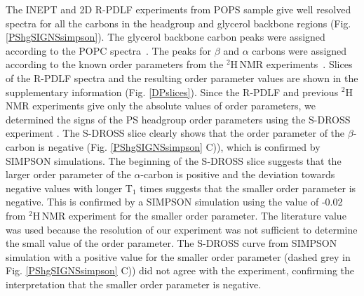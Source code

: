 \documentclass[aps,prl,superscriptaddress,twocolumn]{revtex4}
\begin{document}
The INEPT and 2D R-PDLF experiments from POPS sample give well resolved spectra for all the
carbons in the headgroup and glycerol backbone regions (Fig. \ref{PShgSIGNSsimpson}).
The glycerol backbone carbon peaks were assigned according to the POPC spectra~\cite{ferreira13}.
The peaks for $\beta$ and $\alpha$ carbons were assigned according to the
known order parameters from the $^2$H\,NMR experiments~\cite{browning80}.
Slices of the R-PDLF spectra and the resulting order parameter values
are shown in the supplementary information (Fig. \ref{DPslices}). 
Since the R-PDLF and previous $^2$H\,NMR experiments \cite{browning80,roux91} give 
only the absolute values of order parameters, we determined the signs of the PS headgroup
order parameters using the S-DROSS experiment \cite{gross97}.
The S-DROSS slice clearly shows that the order parameter of
the $\beta$-carbon is negative (Fig. \ref{PShgSIGNSsimpson} C)), 
which is confirmed by SIMPSON simulations. The beginning of the S-DROSS slice
suggests that the larger order parameter of the $\alpha$-carbon 
is positive and the deviation towards negative values with longer T$_1$ times suggests
that the smaller order parameter is negative. This is confirmed by a SIMPSON simulation
using the value of -0.02 from $^2$H\,NMR experiment \cite{roux91} for the smaller order parameter.
The literature value was used because the
resolution of our experiment was not sufficient to determine the
small value of the order parameter.
The S-DROSS curve from SIMPSON simulation with a positive value for the smaller order parameter
(dashed grey in Fig. \ref{PShgSIGNSsimpson} C)) did not agree with the experiment, 
confirming 
the interpretation that the smaller order parameter is negative.
\end{document}
